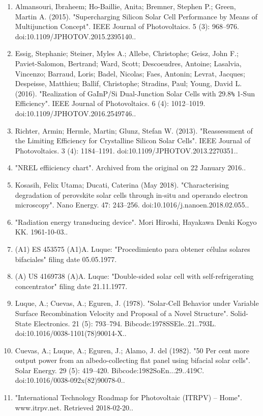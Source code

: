 \begin{enumerate}
\item Almansouri, Ibraheem; Ho-Baillie, Anita; Bremner, Stephen P.; Green, Martin A. (2015). "Supercharging Silicon Solar Cell Performance by Means of Multijunction Concept". IEEE Journal of Photovoltaics. 5 (3): 968–976. doi:10.1109/JPHOTOV.2015.2395140..
\item Essig, Stephanie; Steiner, Myles A.; Allebe, Christophe; Geisz, John F.; Paviet-Salomon, Bertrand; Ward, Scott; Descoeudres, Antoine; Lasalvia, Vincenzo; Barraud, Loris; Badel, Nicolas; Faes, Antonin; Levrat, Jacques; Despeisse, Matthieu; Ballif, Christophe; Stradins, Paul; Young, David L. (2016). "Realization of GaInP/Si Dual-Junction Solar Cells with 29.8\verb|%| 1-Sun Efficiency". IEEE Journal of Photovoltaics. 6 (4): 1012–1019. doi:10.1109/JPHOTOV.2016.2549746..
\item Richter, Armin; Hermle, Martin; Glunz, Stefan W. (2013). "Reassessment of the Limiting Efficiency for Crystalline Silicon Solar Cells". IEEE Journal of Photovoltaics. 3 (4): 1184–1191. doi:10.1109/JPHOTOV.2013.2270351..
\item "NREL effiiciency chart". Archived from the original on 22 January 2016..
\item Kosasih, Felix Utama; Ducati, Caterina (May 2018). "Characterising degradation of perovskite solar cells through in-situ and operando electron microscopy". Nano Energy. 47: 243–256. doi:10.1016/j.nanoen.2018.02.055..
\item "Radiation energy transducing device". Mori Hiroshi, Hayakawa Denki Kogyo KK. 1961-10-03..
\item (A1) ES 453575 (A1)A. Luque: "Procedimiento para obtener células solares bifaciales" filing date 05.05.1977.
\item (A) US 4169738 (A)A. Luque: "Double-sided solar cell with self-refrigerating concentrator" filing date 21.11.1977.
\item Luque, A.; Cuevas, A.; Eguren, J. (1978). "Solar-Cell Behavior under Variable Surface Recombination Velocity and Proposal of a Novel Structure". Solid-State Electronics. 21 (5): 793–794. Bibcode:1978SSEle..21..793L. doi:10.1016/0038-1101(78)90014-X..
\item Cuevas, A.; Luque, A.; Eguren, J.; Alamo, J. del (1982). "50 Per cent more output power from an albedo-collecting flat panel using bifacial solar cells". Solar Energy. 29 (5): 419–420. Bibcode:1982SoEn...29..419C. doi:10.1016/0038-092x(82)90078-0..
\item "International Technology Roadmap for Photovoltaic (ITRPV) – Home". www.itrpv.net. Retrieved 2018-02-20..

\end{enumerate}
